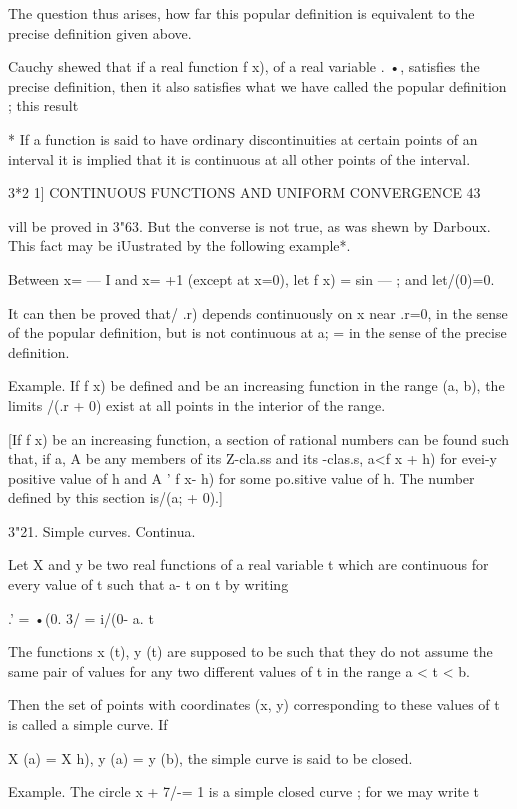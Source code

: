 The question thus arises, how far this popular definition is equivalent to the precise 
definition given above. 

Cauchy shewed that if a real function f x), of a real variable . •, satisfies the precise 
definition, then it also satisfies what we have called the popular definition ; this result 

* If a function is said to have ordinary discontinuities at certain points of an interval it 
is implied that it is continuous at all other points of the interval. 



3*2 1] CONTINUOUS FUNCTIONS AND UNIFORM CONVERGENCE 43 

vill be proved in   3"63. But the converse is not true, as was shewn by Darboux. This 
fact may be iUustrated by the following example*. 

Between x= — I and x= +1 (except at x=0), let f x) = sin — ; and let/(0)=0. 

It can then be proved that/ .r) depends continuously on x near .r=0, in the sense of 
the popular definition, but is not continuous at a; = in the sense of the precise definition. 

Example. If f x) be defined and be an increasing function in the range (a, b), the 
limits /(.r + 0) exist at all points in the interior of the range. 

[If f x) be an increasing function, a section of rational numbers can be found such 
that, if a, A be any members of its Z-cla.ss and its  -clas.s, a<f x + h) for evei-y positive 
value of h and A ' f x- h) for some po.sitive value of h. The number defined by this 
section is/(a; + 0).] 

3"21. Simple curves. Continua. 

Let X and y be two real functions of a real variable t which are continuous 
for every value of t such that a- t %
on t by writing 

.'  =  •(0. 3/ = i/(0-  a. t%

The functions x (t), y (t) are supposed to be such that they do not assume the 
same pair of values for any two different values of t in the range a < t < b. 

Then the set of points with coordinates (x, y) corresponding to these values 
of t is called a simple curve. If 

X (a) = X  h), y (a) = y (b), 
the simple curve is said to be closed. 

Example. The circle x  + 7/-= 1 is a simple closed curve ; for we may write t 


